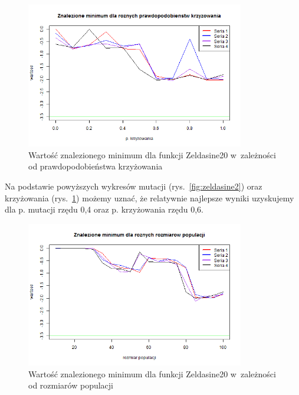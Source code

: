 \documentclass[11pt, a4paper]{article}
\newcommand{\fbi}{\leavevmode{\parindent=1em\indent}}
\begin{document}
\begin{figure}[H]
	\begin{center}
		\includegraphics[width=0.85\textwidth]{./assets/Zeldasine203.png}
		\caption{Wartość znalezionego minimum dla funkcji Zeldasine20 w~zależności od prawdopodobieństwa krzyżowania}
		\label{fig:zeldasine3}
	\end{center}
\end{figure}

\fbi
Na podstawie powyższych wykresów mutacji (rys.~\ref{fig:zeldasine2}) oraz krzyżowania (rys.~\ref{fig:zeldasine3}) możemy uznać, że relatywnie najlepsze wyniki uzyskujemy dla p. mutacji rzędu 0,4 oraz p. krzyżowania rzędu 0,6.

\begin{figure}[H]
	\begin{center}
		\includegraphics[width=0.85\textwidth]{./assets/Zeldasine204.png}
		\caption{Wartość znalezionego minimum dla funkcji Zeldasine20 w~zależności od rozmiarów populacji}
		\label{fig:zeldasine4}
	\end{center}
\end{figure}
\end{document}
